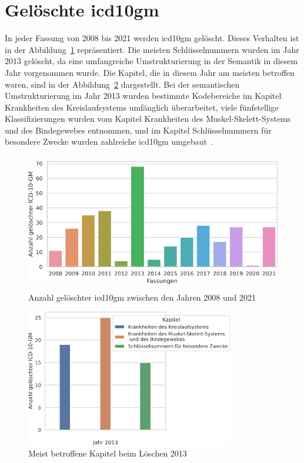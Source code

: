 \section{Gelöschte \acs{icd10gm}} \label{sec:deletedicd}

In jeder Fassung von 2008 bis 2021 werden \ac{icd10gm} gelöscht. Dieses Verhalten ist in der Abbildung~\ref{fig:newdeleteoldicdyear} repräsentiert. Die meisten Schlüsselnummern wurden im Jahr 2013 gelöscht, da eine umfangreiche Umstrukturierung in der Semantik in diesem Jahr vorgenommen wurde. Die Kapitel, die in diesem Jahr am meisten betroffen waren, sind in der Abbildung~\ref{fig:kap13} dargestellt. Bei der semantischen Umstrukturierung im Jahr 2013 wurden bestimmte Kodebereiche im Kapitel \textsf{Krankheiten des Kreislaufsystems} umfänglich überarbeitet, viele fünfstellige Klassifizierungen wurden vom Kapitel \textsf{Krankheiten des Muskel-Skelett-Systems und des Bindegewebes} entnommen, und im Kapitel \textsf{Schlüsselnummern für besondere Zwecke} wurden zahlreiche \ac{icd10gm} umgebaut~\cite{dele13}.

\begin{figure}[ht]
	\centering
	\includegraphics[height=6cm]{figures/neuVersionDelete}
	\caption[Gelöschte \acs{icd10gm} pro Jahr]{Anzahl gelöschter \acs{icd10gm} zwischen den Jahren 2008 und 2021}
	\label{fig:newdeleteoldicdyear}
\end{figure} 

\clearpage

\begin{figure}[ht]
	\centering
	\includegraphics[height=6cm]{figures/kaptnr13}
	\caption{Meist betroffene Kapitel beim Löschen 2013}
	\label{fig:kap13}
\end{figure}


